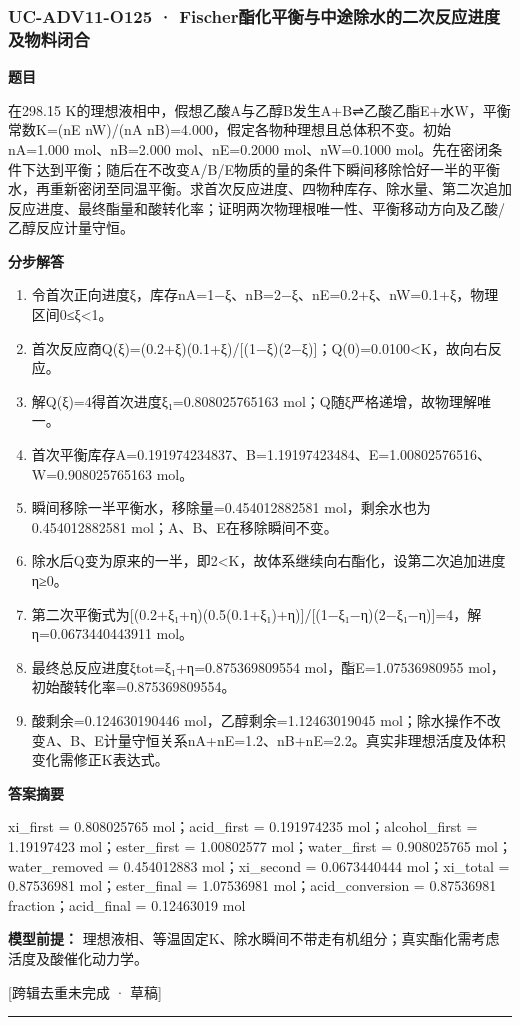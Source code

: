 \documentclass[UTF8,11pt,a4paper]{ctexart}
\begin{document}
\subsubsection*{UC-ADV11-O125 · Fischer酯化平衡与中途除水的二次反应进度及物料闭合}
\noindent\textbf{题目}\par
在298.15 K的理想液相中，假想乙酸A与乙醇B发生A+B⇌乙酸乙酯E+水W，平衡常数K=(nE nW)/(nA nB)=4.000，假定各物种理想且总体积不变。初始nA=1.000 mol、nB=2.000 mol、nE=0.2000 mol、nW=0.1000 mol。先在密闭条件下达到平衡；随后在不改变A/B/E物质的量的条件下瞬间移除恰好一半的平衡水，再重新密闭至同温平衡。求首次反应进度、四物种库存、除水量、第二次追加反应进度、最终酯量和酸转化率；证明两次物理根唯一性、平衡移动方向及乙酸/乙醇反应计量守恒。\par
\medskip\noindent\textbf{分步解答}
\begin{enumerate}
\item 令首次正向进度ξ，库存nA=1−ξ、nB=2−ξ、nE=0.2+ξ、nW=0.1+ξ，物理区间0≤ξ<1。
\item 首次反应商Q(ξ)=(0.2+ξ)(0.1+ξ)/[(1−ξ)(2−ξ)]；Q(0)=0.0100<K，故向右反应。
\item 解Q(ξ)=4得首次进度ξ₁=0.808025765163 mol；Q随ξ严格递增，故物理解唯一。
\item 首次平衡库存A=0.191974234837、B=1.19197423484、E=1.00802576516、W=0.908025765163 mol。
\item 瞬间移除一半平衡水，移除量=0.454012882581 mol，剩余水也为0.454012882581 mol；A、B、E在移除瞬间不变。
\item 除水后Q变为原来的一半，即2<K，故体系继续向右酯化，设第二次追加进度η≥0。
\item 第二次平衡式为[(0.2+ξ₁+η)(0.5(0.1+ξ₁)+η)]/[(1−ξ₁−η)(2−ξ₁−η)]=4，解η=0.0673440443911 mol。
\item 最终总反应进度ξtot=ξ₁+η=0.875369809554 mol，酯E=1.07536980955 mol，初始酸转化率=0.875369809554。
\item 酸剩余=0.124630190446 mol，乙醇剩余=1.12463019045 mol；除水操作不改变A、B、E计量守恒关系nA+nE=1.2、nB+nE=2.2。真实非理想活度及体积变化需修正K表达式。
\end{enumerate}
\noindent\textbf{答案摘要}\par
xi\_first = 0.808025765 mol；acid\_first = 0.191974235 mol；alcohol\_first = 1.19197423 mol；ester\_first = 1.00802577 mol；water\_first = 0.908025765 mol；water\_removed = 0.454012883 mol；xi\_second = 0.0673440444 mol；xi\_total = 0.87536981 mol；ester\_final = 1.07536981 mol；acid\_conversion = 0.87536981 fraction；acid\_final = 0.12463019 mol\par
\noindent\textbf{模型前提：}
理想液相、等温固定K、除水瞬间不带走有机组分；真实酯化需考虑活度及酸催化动力学。\par
\noindent\textcolor{red!65!black}{[跨辑去重未完成 · 草稿]} \par
\medskip\hrule\medskip
{}
\end{document}
